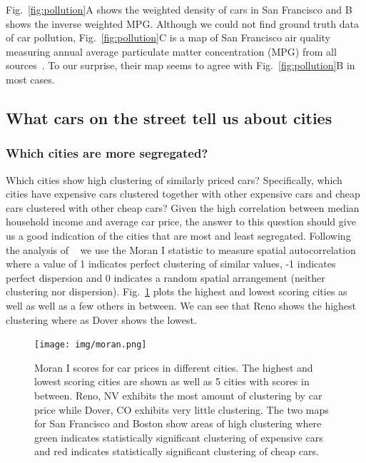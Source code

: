 \documentclass[10pt,twocolumn,letterpaper]{article}
\begin{document}
Fig.~\ref{fig:pollution}A shows the weighted density of cars in San Francisco and B shows the inverse weighted MPG. Although we could not find ground truth data of car pollution, Fig.~\ref{fig:pollution}C is a map of San Francisco air quality measuring annual average particulate matter concentration (MPG) from all sources~\cite{ground_air}. To our surprise, their map seems to agree with Fig.~\ref{fig:pollution}B in most cases.

\subsection{What cars on the street tell us about cities}
\subsubsection{Which cities are more segregated?}
Which cities show high clustering of similarly priced cars? Specifically, which cities have expensive cars clustered together with other expensive cars and cheap cars clustered with other cheap cars? Given the high correlation between median household income and average car price, the answer to this question should give us a good indication of the cities that are most and least segregated. Following the analysis of ~\cite{mit_plos_1} we use the Moran I statistic to measure spatial autocorrelation where a value of 1 indicates perfect clustering of similar values, -1 indicates perfect dispersion and 0 indicates a random spatial arrangement (neither clustering nor dispersion). Fig.~\ref{fig:moran-i} plots the highest and lowest scoring cities as well as well as a few others in between. We can see that Reno shows the highest clustering where as Dover shows the lowest.

\begin{figure}[t]
\begin{center}
    \texttt{[image: img/moran.png]}
\end{center}
   \caption {Moran I scores for car prices in different cities. The highest and lowest scoring cities are shown as well as 5 cities with scores in between. Reno, NV exhibits the most amount of clustering by car price while Dover, CO exhibits very little clustering. The two maps for San Francisco and Boston show areas of high clustering where green indicates statistically significant clustering of expensive cars and red indicates statistically significant clustering of cheap cars.} 
\label{fig:moran-i}
\end{figure}
\end{document}
